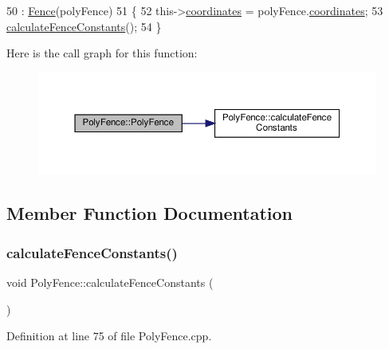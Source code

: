 \begin{DoxyCode}
50         : \hyperlink{class_fence_a5c2be718e885ed9ae2ca048406d126b3}{Fence}(polyFence)
51 \{
52     this->\hyperlink{class_poly_fence_ae8e0c55e745979cab104ef80aeb4b418}{coordinates} = polyFence.\hyperlink{class_poly_fence_ae8e0c55e745979cab104ef80aeb4b418}{coordinates};
53     \hyperlink{class_poly_fence_a229de6f5987bf7d312310b522db0d5a4}{calculateFenceConstants}();
54 \}
\end{DoxyCode}
Here is the call graph for this function\+:
\nopagebreak
\begin{figure}[H]
\begin{center}
\leavevmode
\includegraphics[width=350pt]{d1/d22/class_poly_fence_ad95391c8cf7de0e39cb704cfe771101e_cgraph}
\end{center}
\end{figure}


\subsection{Member Function Documentation}
\mbox{\label{class_poly_fence_a229de6f5987bf7d312310b522db0d5a4}} 
\subsubsection{\texorpdfstring{calculate\+Fence\+Constants()}{calculateFenceConstants()}}
{\footnotesize\ttfamily void Poly\+Fence\+::calculate\+Fence\+Constants (\begin{DoxyParamCaption}{ }\end{DoxyParamCaption})}



Definition at line 75 of file Poly\+Fence.\+cpp.


